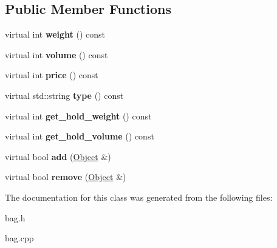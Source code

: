 \subsection*{Public Member Functions}
\begin{DoxyCompactItemize}
\item 
\hypertarget{classda__game_1_1Bag_afb953efbb04ca4575bf0e1801174d10b}{
virtual int {\bfseries weight} () const }
\label{classda__game_1_1Bag_afb953efbb04ca4575bf0e1801174d10b}

\item 
\hypertarget{classda__game_1_1Bag_a40bb85eb64a085aa877ea9b6d12ab37c}{
virtual int {\bfseries volume} () const }
\label{classda__game_1_1Bag_a40bb85eb64a085aa877ea9b6d12ab37c}

\item 
\hypertarget{classda__game_1_1Bag_a92cbfb6c7526e991d7a85a6822ef8857}{
virtual int {\bfseries price} () const }
\label{classda__game_1_1Bag_a92cbfb6c7526e991d7a85a6822ef8857}

\item 
\hypertarget{classda__game_1_1Bag_a86ad15f7a2169cdc0971724460f18c14}{
virtual std::string {\bfseries type} () const }
\label{classda__game_1_1Bag_a86ad15f7a2169cdc0971724460f18c14}

\item 
\hypertarget{classda__game_1_1Bag_a697f83ee4ef9c2b8e4b79a38bfe03cfb}{
virtual int {\bfseries get\_\-hold\_\-weight} () const }
\label{classda__game_1_1Bag_a697f83ee4ef9c2b8e4b79a38bfe03cfb}

\item 
\hypertarget{classda__game_1_1Bag_ae4a79763c6ce34f702d93a245e12f806}{
virtual int {\bfseries get\_\-hold\_\-volume} () const }
\label{classda__game_1_1Bag_ae4a79763c6ce34f702d93a245e12f806}

\item 
\hypertarget{classda__game_1_1Bag_a9f64ac41fdaf87748e6684009cb83f3b}{
virtual bool {\bfseries add} (\hyperlink{classda__game_1_1Object}{Object} \&)}
\label{classda__game_1_1Bag_a9f64ac41fdaf87748e6684009cb83f3b}

\item 
\hypertarget{classda__game_1_1Bag_a91059470c55a1a89ffa5509397b6ef0f}{
virtual bool {\bfseries remove} (\hyperlink{classda__game_1_1Object}{Object} \&)}
\label{classda__game_1_1Bag_a91059470c55a1a89ffa5509397b6ef0f}

\end{DoxyCompactItemize}


The documentation for this class was generated from the following files:\begin{DoxyCompactItemize}
\item 
bag.h\item 
bag.cpp\end{DoxyCompactItemize}
